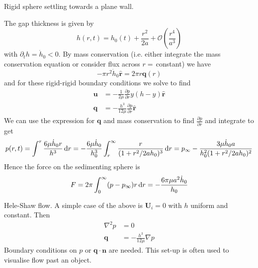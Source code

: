 \documentclass{jknotes}
\begin{document}
\begin{eg}
	Rigid sphere settling towards a plane wall.
	\begin{center}
	\end{center}
	The gap thickness is given by
	\begin{equation}
		h(r,t) = h_0(t) + \frac{r^2}{2a} + \mathcal{O}(\frac{r^4}{a^3})
	\end{equation}
	with $\partial_t h = \dot{h}_0 < 0$. By mass conservation (i.e. either
	integrate the mass conservation equation or consider flux across $r =\,
	$constant) we have
	\begin{equation}
		-\pi r^2 \dot{h}_0 \hat{\symbf{r}} = 2\pi r \symbf{q}(r)
	\end{equation}
	and for these rigid-rigid boundary conditions we solve to find
	\begin{align}
		\symbf{u} &= -\frac{1}{2\mu}\frac{\partial p}{\partial r} y(h-y)
		\hat{\symbf{r}} \\
		\symbf{q} &= -\frac{h^3}{12\mu} \frac{\partial p}{\partial r}
		\hat{\symbf{r}}
	\end{align}
	We can use the expression for $\symbf{q}$ and mass conservation to find
	$\frac{\partial p}{\partial r}$ and integrate to get
	\begin{equation}
		p(r,t) = \int^r \frac{6\mu \dot{h}_0 r}{h^3} \, \diffd r = -\frac{6
		\mu \dot{h}_0}{h_0^3} \int_r^\infty \frac{r}{(1+r^2/2ah_0)^3} \,
		\diffd r = p_\infty - \frac{3\mu \dot{h}_0 a}{h_0^2 (1+r^2/2ah_0)^2}
	\end{equation}
	Hence the force on the sedimenting sphere is
	\begin{equation}
		F = 2\pi \int_0^\infty (p-p_\infty) r \, \diffd r = -\frac{6\pi \mu
		a^2 \dot{h}_0}{h_0}
	\end{equation}
\end{eg}
\begin{eg}
	Hele-Shaw flow. A simple case of the above is $\symbf{U}_i = 0$ with $h$
	uniform and constant. Then
	\begin{align}
		\nabla^2 p &= 0 \\
		\symbf{q} &= -\frac{h^3}{12\mu} \nabla p
	\end{align}
	Boundary conditions on $p$ or $\symbf{q}\cdot\symbf{n}$ are needed. This
	set-up is often used to visualise flow past an object.
\end{eg}
\end{document}
